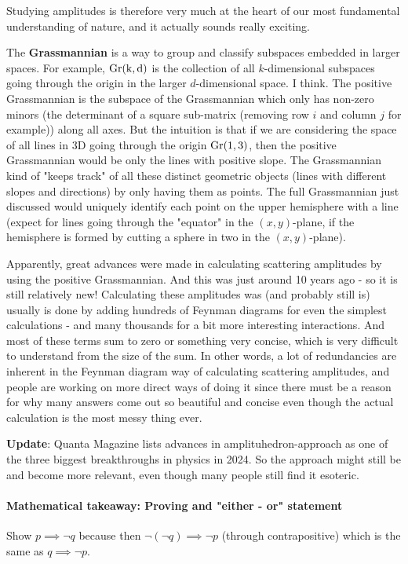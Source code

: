 Studying amplitudes is therefore very much at the heart of our most fundamental understanding of nature, and it actually sounds really exciting.

The \textbf{Grassmannian} is a way to group and classify subspaces embedded in larger spaces. For example, \(\rm{Gr}(k, d)\) is the collection of all \(k\)-dimensional subspaces going through the origin in the larger \(d\)-dimensional space. I think. The positive Grassmannian is the subspace of the Grassmannian which only has non-zero minors (the determinant of a square sub-matrix (removing row \(i\) and column \(j\) for example)) along all axes. But the intuition is that if we are considering the space of all lines in 3D going through the origin \(\rm{Gr}(1, 3)\), then the positive Grassmannian would be only the lines with positive slope. The Grassmannian kind of "keeps track" of all these distinct geometric objects (lines with different slopes and directions) by only having them as points. The full Grassmannian just discussed would uniquely identify each point on the upper hemisphere with a line (expect for lines going through the "equator" in the \((x, y)\)-plane, if the hemisphere is formed by cutting a sphere in two in the \((x,y)\)-plane).

Apparently, great advances were made in calculating scattering amplitudes by using the positive Grassmannian. And this was just around 10 years ago - so it is still relatively new! Calculating these amplitudes was (and probably still is) usually is done by adding hundreds of Feynman diagrams for even the simplest calculations - and many thousands for a bit more interesting interactions. And most of these terms sum to zero or something very concise, which is very difficult to understand from the size of the sum. In other words, a lot of redundancies are inherent in the Feynman diagram way of calculating scattering amplitudes, and people are working on more direct ways of doing it since there must be a reason for why many answers come out so beautiful and concise even though the actual calculation is the most messy thing ever.

\textbf{Update}: Quanta Magazine lists advances in amplituhedron-approach as one of the three biggest breakthroughs in physics in 2024. So the approach might still be and become more relevant, even though many people still find it esoteric. 

\paragraph{Mathematical takeaway: Proving and "either - or" statement}
Show \(p \implies \neg q\) because then \(\neg(\neg q) \implies \neg p\) (through contrapositive) which is the same as \(q \implies \neg p\). 

